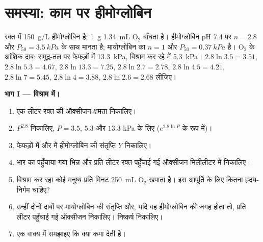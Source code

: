 \section{समस्या: काम पर हीमोग्लोबिन}

\begin{problem}
\label{pb:b1:proteins:1}
रक्त में \qty{150}{g/L} हीमोग्लोबिन है; \qty{1}{g}
\qty{1.34}{mL} $\mathrm{O_2}$ बाँधता है। हीमोग्लोबिन pH 7.4 पर
$n = 2.8$ और $P_{50} = \qty{3.5}{kPa}$ के साथ  मानता है;
मायोग्लोबिन का $n = 1$ और $P_{50} = \qty{0.37}{kPa}$ है।
$\mathrm{O_2}$ के आंशिक दाब: समुद्र-तल पर फेफड़ों में \qty{13.3}{kPa},
विश्राम कर रहे  में \qty{5.3}{kPa}। $2.8\ln 3.5 = 3.51$,
$2.8\ln 5.3 = 4.67$, $2.8\ln 13.3 = 7.25$, $2.8\ln 2.7 = 2.78$,
$2.8\ln 4.5 = 4.21$, $2.8\ln 7 = 5.45$, $2.8\ln 4 = 3.88$,
$2.8\ln 2.6 = 2.68$ लीजिए।

\medskip
\noindent\textbf{भाग I --- विश्राम में।}
\begin{enumerate}
  \item एक लीटर रक्त की ऑक्सीजन-क्षमता निकालिए।
  \item $P^{2.8}$ निकालिए, $P = 3.5$, $5.3$ और $13.3$ kPa के लिए
        ($e^{2.8\ln P}$ के रूप में)।
  \item फेफड़ों में और  में हीमोग्लोबिन की संतृप्ति $Y$ निकालिए।
  \item भार का पहुँचाया गया भिन्न और प्रति लीटर रक्त पहुँचाई गई ऑक्सीजन
        मिलीलीटर में निकालिए।
  \item विश्राम कर रहा कोई मनुष्य प्रति मिनट \qty{250}{mL}
        $\mathrm{O_2}$ खपाता है। इस आपूर्ति के लिए कितना हृदय-निर्गम
        चाहिए?
  \item उन्हीं दोनों दाबों पर मायोग्लोबिन की संतृप्ति और, यदि वह
        हीमोग्लोबिन की जगह होता तो, प्रति लीटर पहुँचाई गई ऑक्सीजन
        निकालिए। निष्कर्ष निकालिए।
  \item एक वाक्य में समझाइए कि  क्या कमा देती है।
\end{enumerate}


\end{problem}
